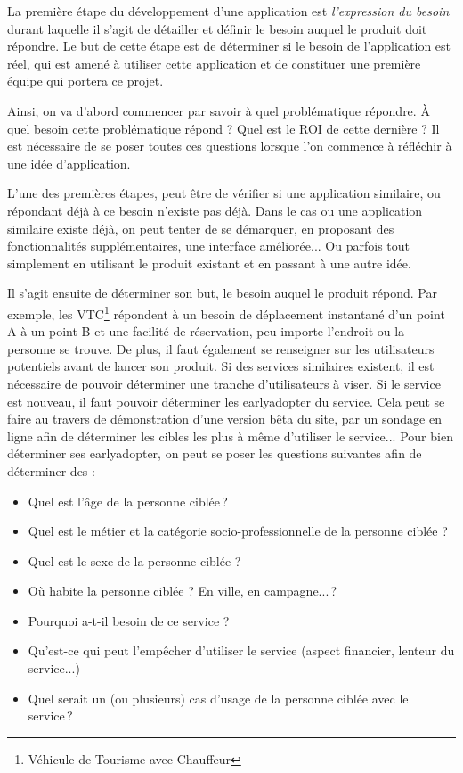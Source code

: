 La première étape du développement d'une application est \emph{l'expression du besoin} durant laquelle il s'agit de détailler et définir le besoin auquel le produit doit répondre. Le but de cette étape est de déterminer si le besoin de l'application est réel, qui est amené à utiliser cette application et de constituer une première équipe qui portera ce projet.

Ainsi, on va d'abord commencer par savoir à quel problématique répondre. À quel besoin cette problématique répond ? Quel est le \gls{ROI} de cette dernière ? Il est nécessaire de se poser toutes ces questions lorsque l'on commence à réfléchir à une idée d'application.

L'une des premières étapes, peut être de vérifier si une application similaire, ou répondant déjà à ce besoin n'existe pas déjà. Dans le cas ou une application similaire existe déjà, on peut tenter de se démarquer, en proposant des fonctionnalités supplémentaires, une interface améliorée... Ou parfois tout simplement en utilisant le produit existant et en passant à une autre idée.

Il s'agit ensuite de déterminer son but, le besoin auquel le produit répond. Par exemple, les VTC\footnote{Véhicule de Tourisme avec Chauffeur} répondent à un besoin de déplacement instantané d'un point A à un point B et une facilité de réservation, peu importe l'endroit ou la personne se trouve. De plus, il faut également se renseigner sur les utilisateurs potentiels avant de lancer son produit. Si des services similaires existent, il est nécessaire de pouvoir déterminer une tranche d'utilisateurs à viser. Si le service est nouveau, il faut pouvoir déterminer les \gls{earlyadopter} du service. Cela peut se faire au travers de démonstration d'une version bêta du site, par un sondage en ligne afin de déterminer les cibles les plus à même d'utiliser le service... Pour bien déterminer ses \gls{earlyadopter}, on peut se poser les questions suivantes afin de déterminer des  :

\begin{itemize}
	\setlength\itemsep{-0.5em}
	\item Quel est l'âge de la personne ciblée ?
	\item Quel est le métier et la catégorie socio-professionnelle de la personne ciblée ?
	\item Quel est le sexe de la personne ciblée ? 
	\item Où habite la personne ciblée ? En ville, en campagne... ? 
	\item Pourquoi a-t-il besoin de ce service ? 
	\item Qu'est-ce qui peut l'empêcher d'utiliser le service (aspect financier, lenteur du service...) 
	\item Quel serait un (ou plusieurs) cas d'usage de la personne ciblée avec le service ?
\end{itemize}

